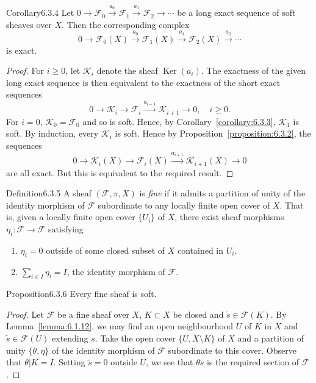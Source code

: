 \begin{originaltheorem}{Corollary}{6.3.4}
Let $0\to\mathcal F_0\xrightarrow{a_0}\mathcal F_1\xrightarrow{a_1}\mathcal F_2\to\cdots$ be a long exact sequence of soft sheaves over $X$. Then the corresponding complex
\[
0\to\mathcal F_0(X)\xrightarrow{a_0}\mathcal F_1(X)\xrightarrow{a_1}\mathcal F_2(X)\xrightarrow{a_2}\cdots
\]
is exact.
\end{originaltheorem}
\begin{proof}
For $i\geq0$, let $\mathcal K_i$ denote the sheaf $\operatorname{Ker}(a_i)$. The exactness of the given long exact sequence is then equivalent to the exactness of the short exact sequences
\[
0\to\mathcal K_i\to\mathcal F_i\xrightarrow{a_{i+1}}\mathcal K_{i+1}\to0,\quad i\geq0.
\]
For $i=0$, $\mathcal K_0=\mathcal F_0$ and so is soft. Hence, by Corollary~\ref{corollary:6.3.3}, $\mathcal K_1$ is soft. By induction, every $\mathcal K_i$ is soft. Hence by Proposition~\ref{proposition:6.3.2}, the sequences
\[
0\to\mathcal K_i(X)\to\mathcal F_i(X)\xrightarrow{a_{i+1}}\mathcal K_{i+1}(X)\to0
\]
are all exact. But this is equivalent to the required result.
\end{proof}
\begin{originaltheorem}{Definition}{6.3.5}
A sheaf $(\mathcal F,\pi,X)$ is \emph{fine} if it admits a partition of unity of the identity morphism of $\mathcal F$ subordinate to any locally finite open cover of $X$. That is, given a locally finite open cover $\{U_i\}$ of $X$, there exist sheaf morphisms $\eta_i:\mathcal F\to\mathcal F$ satisfying
\begin{enumerate}
\item $\eta_i=0$ outside of some closed subset of $X$ contained in $U_i$.
\item $\sum_{i\in I}\eta_i=I$, the identity morphism of $\mathcal F$.
\end{enumerate}
\end{originaltheorem}
\begin{originaltheorem}{Proposition}{6.3.6}
Every fine sheaf is soft.
\end{originaltheorem}
\begin{proof}
Let $\mathcal F$ be a fine sheaf over $X$, $K\subset X$ be closed and $\widetilde s\in\mathcal F(K)$. By Lemma~\ref{lemma:6.1.12}, we may find an open neighbourhood $U$ of $K$ in $X$ and $\widetilde s\in\mathcal F(U)$ extending $s$. Take the open cover $\{U,X\setminus K\}$ of $X$ and a partition of unity $\{\theta,\eta\}$ of the identity morphism of $\mathcal F$ subordinate to this cover. Observe that $\theta|K=I$. Setting $\widetilde s=0$ outside $U$, we see that $\theta\widetilde s$ is the required section of $\mathcal F$.
\end{proof}
